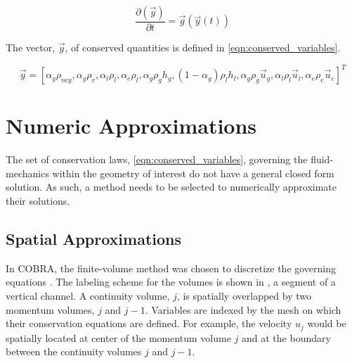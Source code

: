 \begin{equation}
\label{eqn:conservation_equations}
\frac{\partial \left( \vec{y} \right)}{\partial t} = \vec{g}(\vec{y}(t))
\end{equation}

The vector, $\vec{y}$, of conserved quantities is defined in \eqref{eqn:conserved_variables}.

\begin{equation}
\label{eqn:conserved_variables}
\vec{y} = [\alpha_g \rho_{ncg}, \alpha_g \rho_v, \alpha_l \rho_l, \alpha_e \rho_l, \alpha_g \rho_g h_g, (1 - \alpha_g) \rho_l h_l, \alpha_g \rho_g \vec{u}_g, \alpha_l \rho_l \vec{u}_l, \alpha_e \rho_e \vec{u}_e]^{T}
\end{equation}

\section{Numeric Approximations}
\label{sect:numeric_approximation}
The set of conservation laws, \eqref{eqn:conserved_variables}, governing the fluid-mechanics within the geometry of interest do not have a general closed form solution.
As such, a method needs to be selected to numerically approximate their solutions.

\subsection{Spatial Approximations}
\label{subsect:spatial_approx}
In COBRA, the finite-volume method was chosen to discretize the governing equations \cite{LeVeque2002}.
The labeling scheme for the volumes is shown in , a segment of a vertical channel.
A continuity volume, $j$, is spatially overlapped by two momentum volumes, $j$ and $j-1$.
Variables are indexed by the mesh on which their conservation equations are defined.
For example, the velocity $u_j$ would be spatially located at center of the momentum volume $j$ and at the boundary between the continuity volumes $j$ and $j-1$.

